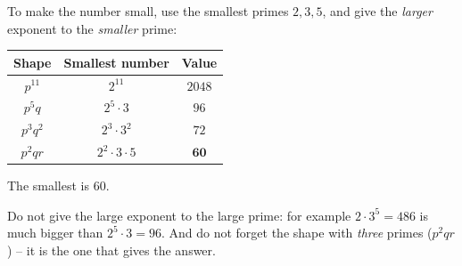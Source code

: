 {
To make the number small, use the smallest primes $2,3,5$, and give the \emph{larger} exponent to the \emph{smaller} prime:
\begin{center}
\begin{tabular}{|c|c|c|}
\hline
\rowcolor{Tint}Shape & Smallest number & Value\\
\hline
$p^{11}$ & $2^{11}$ & $2048$\\
$p^{5}q$ & $2^5\cdot 3$ & $96$\\
$p^{3}q^{2}$ & $2^3\cdot 3^2$ & $72$\\
$p^{2}qr$ & $2^2\cdot 3\cdot 5$ & $\mathbf{60}$\\
\hline
\end{tabular}
\end{center}
The smallest is $60$.

\begin{warnbox}Do not give the large exponent to the large prime: for example $2\cdot 3^5=486$ is much bigger than $2^5\cdot 3=96$. And do not forget the shape with \emph{three} primes ($p^2qr$) -- it is the one that gives the answer.\end{warnbox}

}

